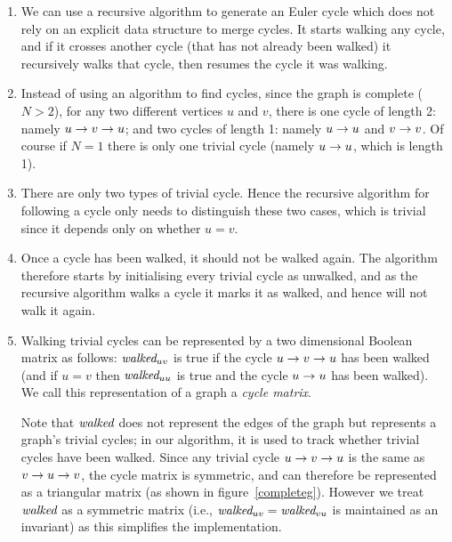 \documentclass[12pt]{article}
\begin{document}
\begin{enumerate}\raggedright
\item
We can use a recursive algorithm to generate an Euler cycle which does not rely on an explicit data structure to merge cycles. It starts walking any cycle, and if it crosses another cycle (that has not already been walked) it recursively walks that cycle, then resumes the cycle it was walking.

\item
Instead of using an algorithm to find cycles, since the graph is complete ($N>2$), for any two different vertices $u$ and $v$, there is one cycle of length 2: namely $\pair uv$; and two cycles of length 1: namely $\pair uu$ and $\pair vv$. Of course if $N=1$ there is only one trivial cycle (namely $\pair uu$, which is length 1).

\item
There are only two types of trivial cycle. Hence the recursive algorithm for following a cycle only needs to distinguish these two cases, which is trivial since it depends only on whether $u=v$.

\item
Once a cycle has been walked, it should not be walked again. The algorithm therefore starts by initialising every trivial cycle as unwalked, and as the recursive algorithm walks a cycle it marks it as walked, and hence will not walk it again.

\item
Walking trivial cycles can be represented by a two dimensional Boolean matrix as follows: $\mbox{\it walked}_{uv}$ is true if the cycle $\pair uv$ has been walked (and if $u=v$ then $\mbox{\it walked}_{uu}$ is true and the cycle $\pair uu$ has been walked). We call this representation of a graph a \emph{cycle matrix}.

Note that $\mbox{\it walked}$ does not represent the edges of the graph but represents a graph's trivial cycles; in our algorithm, it is used to track whether trivial cycles have been walked. Since any trivial cycle $\pair uv$ is the same as $\pair vu$, the cycle matrix is symmetric, and can therefore be represented as a triangular matrix (as shown in figure~\ref{completeg}). However we treat $\mbox{\it walked}$ as a symmetric matrix (i.e., $\mbox{\it walked}_{uv}=\mbox{\it walked}_{vu}$ is maintained as an invariant) as this simplifies the implementation.
\end{enumerate}
\end{document}
